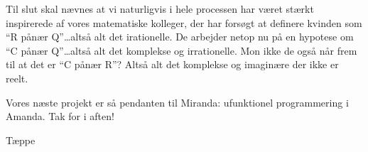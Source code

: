 \documentclass[danish]{article}
\begin{document}
\begin{sketch}
 Til slut skal nævnes at vi naturligvis i hele processen har været
stærkt inspirerede af vores matematiske kolleger, der har forsøgt at definere
kvinden som ``R pånær Q''\ldots altså alt det irationelle. De arbejder netop nu
på en hypotese om ``C pånær Q''\ldots altså alt det komplekse og irrationelle.
Mon ikke de også når frem til at det er ``C pånær R''? Altså alt det komplekse
og imaginære der ikke er reelt.

 Vores næste projekt er så pendanten til Miranda: ufunktionel
programmering i Amanda. Tak for i aften!

\scene Tæppe

\end{sketch}
\end{document}
